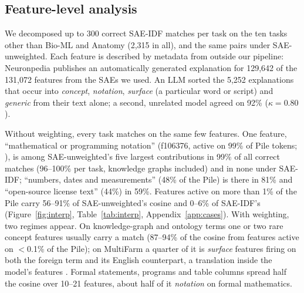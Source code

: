 \documentclass[11pt]{article}
\newcommand{\method}{SAE\mbox{-}IDF\xspace}
\begin{document}
\subsection{Feature-level analysis}
\label{sec:interp}

We decomposed up to 300 correct \method matches per task on the ten tasks other than Bio-ML and Anatomy (2,315 in all), and the same pairs under SAE-unweighted.
Each feature is described by metadata from outside our pipeline: Neuronpedia \citep{lin2023neuronpedia} publishes an automatically generated explanation \citep{bills2023language} for 129,642 of the 131,072 features from the SAEs we used.
An LLM sorted the 5,252 explanations that occur into \emph{concept}, \emph{notation}, \emph{surface} (a particular word or script) and \emph{generic} from their text alone; a second, unrelated model agreed on 92\% ($\kappa=0.80$).

Without weighting, every task matches on the same few features.
One feature, ``mathematical or programming notation'' (f106376, active on 99\% of Pile tokens; \citealp{gao2020pile}), is among SAE-unweighted's five largest contributions in 99\% of all correct matches (96--100\% per task, knowledge graphs included) and in none under \method; ``numbers, dates and measurements'' (48\% of the Pile) is there in 81\% and ``open-source license text'' (44\%) in 59\%.
Features active on more than 1\% of the Pile carry 56--91\% of SAE-unweighted's cosine and 0--6\% of \method's (Figure~\ref{fig:interp}, Table~\ref{tab:interp}, Appendix~\ref{app:cases}).
With weighting, two regimes appear.
On knowledge-graph and ontology terms one or two rare concept features usually carry a match (87--94\% of the cosine from features active on $<$0.1\% of the Pile); on MultiFarm a quarter of it is \emph{surface} features firing on both the foreign term and its English counterpart, a translation inside the model's features \citep{templeton2024scaling, brinkmann2025grammatical}.
Formal statements, programs and table columns spread half the cosine over 10--21 features, about half of it \emph{notation} on formal mathematics.
\end{document}
